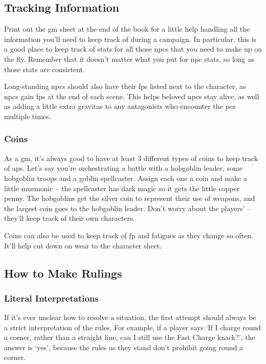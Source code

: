 \begin{multicols}{2}
\subsection{Tracking Information}

Print out the \gls{gm} sheet at the end of the book for a little help handling all the information you'll need to keep track of during a campaign.
In particular, this is a good place to keep track of stats for all those \glspl{npc} that you need to make up on the fly.
Remember that it doesn't matter what you put for \gls{npc} stats, so long as those stats are consistent.

Long-standing \glspl{npc} should also have their \glspl{fp} listed next to the character, as \glspl{npc} gain \glspl{fp} at the end of each scene.
This helps beloved \glspl{npc} stay alive, as well as adding a little extra gravitas to any antagonists who encounter the \glspl{pc} multiple times.

\subsubsection{Coins}

As a \gls{gm}, it's always good to have at least 3 different types of coins to keep track of \glspl{ap}.
Let's say you're orchestrating a battle with a hobgoblin leader, some hobgoblin troops and a goblin spellcaster.
Assign each one a coin and make a little mnemonic -- the spellcaster has dark magic so it gets the little copper penny.
The hobgoblins get the silver coin to represent their use of weapons, and the largest coin goes to the hobgoblin leader.
Don't worry about the players'  -- they'll keep track of their own characters.

Coins can also be used to keep track of \gls{fp} and \glspl{fatigue} as they change so often.
It'll help cut down on wear to the character sheet.

\subsection{How to Make Rulings}

\subsubsection{Literal Interpretations}

If it's ever unclear how to resolve a situation, the first attempt should always be a strict interpretation of the rules.
For example, if a player says `If I charge round a corner, rather than a straight line, can I still use the Fast Charge knack?', the answer is `yes', because the rules as they stand don't prohibit going round a corner.


\end{multicols}
